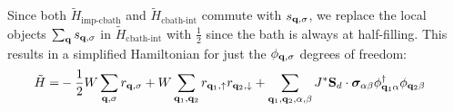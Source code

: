 \documentclass[reprint,hidelinks,onecolumn]{revtex4-2}
\begin{document}
Since both \(\tilde H_\text{imp-cbath}\) and \(\tilde H_\text{cbath-int}\) commute with \(s_{{\bf q}, \sigma}\), we replace the local objects \(\sum_{\bf q}s_{{\bf q},\sigma}\) in \(\tilde H_\text{cbath-int}\) with \(\frac{1}{2}\) since the bath is always at half-filling. This results in a simplified Hamiltonian for just the \(\phi_{{\bf q},\sigma}\) degrees of freedom:
\begin{equation}\begin{aligned}
	\tilde H =& -\frac{1}{2}W\sum_{{\bf q},\sigma}r_{{\bf q},\sigma} + W\sum_{{\bf q}_1,{\bf q}_2}r_{{\bf q}_1,\uparrow} r_{{\bf q}_2,\downarrow} + \sum_{{\bf q}_1, {\bf q}_2,\alpha,\beta}J^*{\bf S}_d\cdot{\boldsymbol\sigma}_{\alpha\beta} {\phi}^\dagger_{{\bf q}_1\alpha} \phi_{{\bf q}_2\beta}
\end{aligned}\end{equation}
\end{document}

